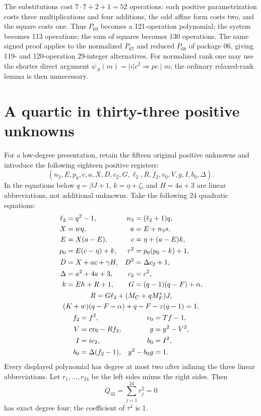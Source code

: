 \documentclass[11pt,a4paper]{article}
\theoremstyle{remark}\newtheorem{remark}[theorem]{Remark}
\begin{document}
The substitutions cost $7\cdot7+2+1=52$ operations:
each positive parametrization costs three multiplications and four
additions, the odd affine form costs two, and the square costs one.
Thus $P_{69}$ becomes a 121-operation polynomial; the system becomes
113 operations; the sum of squares becomes 130 operations.
The same signed proof applies to the normalized $P_{67}$ and
reduced $P_{68}$ of package 06, giving 119- and 120-operation
29-integer alternatives. For normalized rank one may use the shorter
direct argument $\psi_A(m)=|i|c^2\Rightarrow pc\mid m$;
the ordinary relaxed-rank lemma is then unnecessary.

\section{A quartic in thirty-three positive unknowns}\label{sec:quartic}
For a low-degree presentation, retain the fifteen original positive
unknowns and introduce the following eighteen positive registers:
\[
 (n_3,E,p_0,c,a,X,D,c_2,G,\ell_2,R,f_2,v_0,V,g,I,b_0,\Delta).
\]
In the equations below $q=\beta J+1$, $k=\eta+\zeta$, and
$H=4a+3$ are linear abbreviations, not additional unknowns.
Take the following 24 quadratic equations:
\begin{gather}
\begin{aligned}
 \ell_2&=q^2-1,& n_3&=(\ell_2+1)q,\\
 X&=wq,&a&=E+n_3s,\\
 E&=X(a-E),&c&=\eta+(a-E)k,\\
 p_0&=E(c-\eta)+k,&\tau^2&=p_0(p_0-k)+1,\\
 D&=X+ac+\gamma H,&D^2&=\Delta c_2+1,\\
 \Delta&=a^2+4a+3,&c_2&=c^2,\\
 k&=Eh+R+1,&G&=(q-1)(q-F)+\alpha,
\end{aligned}\notag\\
 R=G\ell_2+(M_C+qM_F^*)J,\notag\\
 (K+w)(q-F-\alpha)+q-F-z(q-1)=1,\notag\\
\begin{aligned}
 f_2&=f^2,&v_0&=Tf-1,\\
 V&=cv_0-Rf_2,&g&=y^2-V^2,\\
 I&=ic_2,&b_0&=I^2,\\
 b_0&=\Delta(f_2-1),&y^2-b_0g&=1.
\end{aligned}\label{eq:quadratic}
\end{gather}
Every displayed polynomial has degree at most two after inlining the
three linear abbreviations. Let $r_1,\ldots,r_{24}$ be the left sides
minus the right sides. Then
\[
 \boxed{Q_{33}=\sum_{j=1}^{24}r_j^2=0}
\]
has exact degree four; the coefficient of $\tau^4$ is 1.
\end{document}
